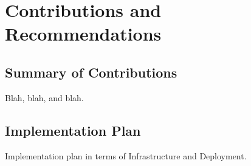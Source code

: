 \chapter{Contributions and Recommendations}

\section{Summary of Contributions}

Blah, blah, and blah.

\section{Implementation Plan}

Implementation plan in terms of Infrastructure and Deployment.


